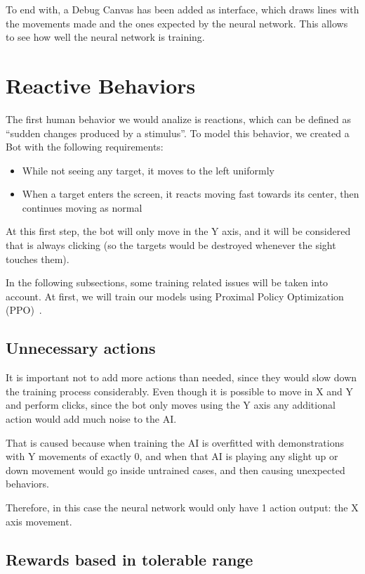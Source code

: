 To end with, a Debug Canvas has been added as interface, which draws lines with the movements made and the ones expected by the neural network. This allows to see how well the neural network is training.

\section{Reactive Behaviors}

The first human behavior we would analize is reactions, which can be defined as ``sudden changes produced by a stimulus''. To model this behavior, we created a Bot with the following requirements:

\begin{itemize}
 \item While not seeing any target, it moves to the left uniformly
 \item When a target enters the screen, it reacts moving fast towards its center, then continues moving as normal
\end{itemize}

At this first step, the bot will only move in the Y axis, and it will be considered that is always clicking (so the targets would be destroyed whenever the sight touches them).

In the following subsections, some training related issues will be taken into account. At first, we will train our models using Proximal Policy Optimization (PPO)~\cite{ppopolicy}.

\subsection{Unnecessary actions}
It is important not to add more actions than needed, since they would slow down the training process considerably. Even though it is possible to move in X and Y and perform clicks, since the bot only moves using the Y axis any additional action would add much noise to the AI. 

That is caused because when training the AI is overfitted with demonstrations with Y movements of exactly 0, and when that AI is playing any slight up or down movement would go inside untrained cases, and then causing unexpected behaviors.

Therefore, in this case the neural network would only have 1 action output: the X axis movement.

\subsection{Rewards based in tolerable range}

